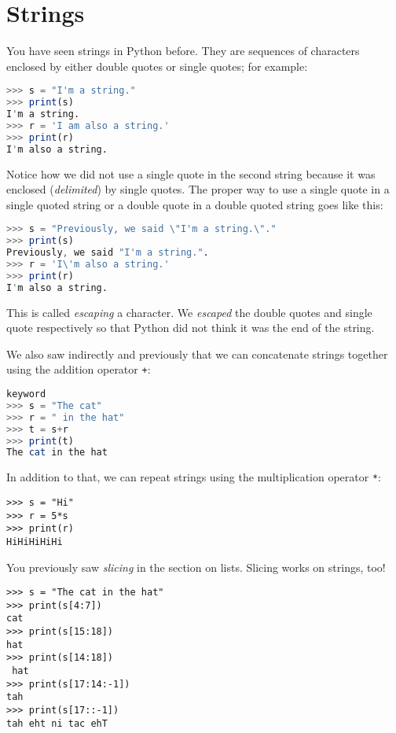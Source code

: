 \documentclass[11pt]{cselabheader}
\begin{document}
\section{Strings}

You have seen strings in Python before. They are sequences of characters
enclosed by either double quotes or single quotes; for example:
\begin{lstlisting}[style=ipython,language=Octave] % string escaping issues with Python style
>>> s = "I'm a string."
>>> print(s)
I'm a string.
>>> r = 'I am also a string.'
>>> print(r)
I'm also a string.
\end{lstlisting}

Notice how we did not use a single quote in the second string because it was
enclosed (\emph{delimited}) by single quotes. The proper way to use a single
quote in a single quoted string or a double quote in a double quoted string
goes like this:
\begin{lstlisting}[style=ipython,language=Octave]
>>> s = "Previously, we said \"I'm a string.\"."
>>> print(s)
Previously, we said "I'm a string.".
>>> r = 'I\'m also a string.'
>>> print(r)
I'm also a string.
\end{lstlisting}
This is called \emph{escaping} a character. We \emph{escaped} the double quotes
and single quote respectively so that Python did not think it was the end of
the string.


We also saw indirectly and previously that we can concatenate strings together
using the addition operator \lstinline!+!:
\begin{lstlisting}[style=ipython,language=Octave] % octave doesn't have in
keyword
>>> s = "The cat"
>>> r = " in the hat"
>>> t = s+r
>>> print(t)
The cat in the hat
\end{lstlisting}

In addition to that, we can repeat strings using the multiplication operator
\lstinline!*!: 
\begin{lstlisting}[style=ipython]
>>> s = "Hi"
>>> r = 5*s
>>> print(r)
HiHiHiHiHi
\end{lstlisting}


You previously saw \emph{slicing} in the section on lists. Slicing works on strings, too!
\begin{lstlisting}[style=ipython]
>>> s = "The cat in the hat"
>>> print(s[4:7])
cat
>>> print(s[15:18])
hat
>>> print(s[14:18])
 hat
>>> print(s[17:14:-1])
tah
>>> print(s[17::-1])
tah eht ni tac ehT
\end{lstlisting}
\end{document}
